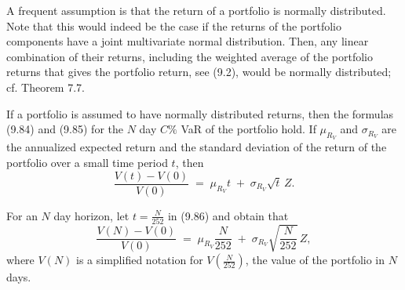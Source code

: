 
A frequent assumption is that the return of a portfolio is normally
distributed. Note that this would indeed be the case if the returns of the
portfolio components have a joint multivariate normal distribution. Then, any
linear combination of their returns, including the weighted average of the
portfolio returns that gives the portfolio return, see (9.2), would be
normally distributed; cf. Theorem 7.7.

If a portfolio is assumed to have normally distributed returns, then the
formulas (9.84) and (9.85) for the $N$ day $C\%$ VaR of the portfolio hold. If
$\mu_{R_V}$ and $\sigma_{R_V}$ are the annualized expected return and the
standard deviation of the return of the portfolio over a small time period
$t$, then
\begin{equation}
\frac{V(t)-V(0)}{V(0)} \;=\; \mu_{R_V} t \;+\; \sigma_{R_V}\sqrt{t}\,Z.
\end{equation}

For an $N$ day horizon, let $t = \frac{N}{252}$ in (9.86) and obtain that
\begin{equation}
\frac{V(N)-V(0)}{V(0)} \;=\; \mu_{R_V}\frac{N}{252} \;+\; \sigma_{R_V}\sqrt{\frac{N}{252}}\,Z,
\end{equation}
where $V(N)$ is a simplified notation for $V\left(\frac{N}{252}\right)$, the
value of the portfolio in $N$ days.

